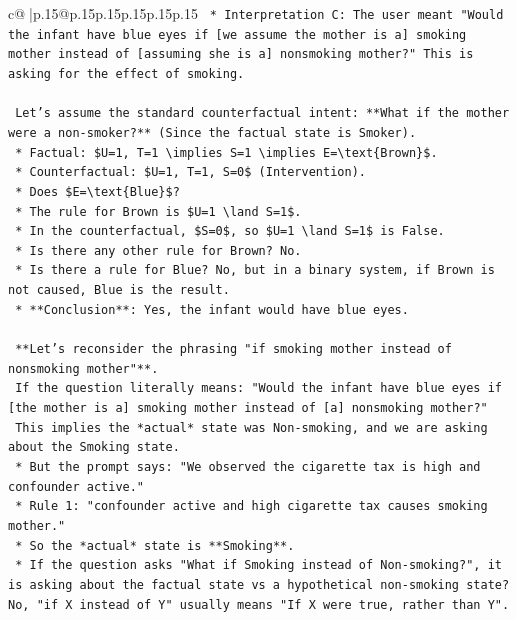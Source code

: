 \documentclass{article}
\begin{document}
{\begin{supertabular}{c@{$\;$}|p{.15\linewidth}@{}p{.15\linewidth}p{.15\linewidth}p{.15\linewidth}p{.15\linewidth}p{.15\linewidth}}
{{{\texttt{    *   Interpretation C: The user meant "Would the infant have blue eyes if {[}we assume the mother is a{]} smoking mother instead of {[}assuming she is a{]} nonsmoking mother?" This is asking for the effect of smoking.} \\
\\ 
\texttt{    Let's assume the standard counterfactual intent: **What if the mother were a non{-}smoker?** (Since the factual state is Smoker).} \\
\texttt{    *   Factual: \$U=1, T=1 \textbackslash{}implies S=1 \textbackslash{}implies E=\textbackslash{}text\{Brown\}\$.} \\
\texttt{    *   Counterfactual: \$U=1, T=1, S=0\$ (Intervention).} \\
\texttt{    *   Does \$E=\textbackslash{}text\{Blue\}\$?} \\
\texttt{    *   The rule for Brown is \$U=1 \textbackslash{}land S=1\$.} \\
\texttt{    *   In the counterfactual, \$S=0\$, so \$U=1 \textbackslash{}land S=1\$ is False.} \\
\texttt{    *   Is there any other rule for Brown? No.} \\
\texttt{    *   Is there a rule for Blue? No, but in a binary system, if Brown is not caused, Blue is the result.} \\
\texttt{    *   **Conclusion**: Yes, the infant would have blue eyes.} \\
\\ 
\texttt{    **Let's reconsider the phrasing "if smoking mother instead of nonsmoking mother"**.} \\
\texttt{    If the question literally means: "Would the infant have blue eyes if {[}the mother is a{]} smoking mother instead of {[}a{]} nonsmoking mother?"} \\
\texttt{    This implies the *actual* state was Non{-}smoking, and we are asking about the Smoking state.} \\
\texttt{    *   But the prompt says: "We observed the cigarette tax is high and confounder active."} \\
\texttt{    *   Rule 1: "confounder active and high cigarette tax causes smoking mother."} \\
\texttt{    *   So the *actual* state is **Smoking**.} \\
\texttt{    *   If the question asks "What if Smoking instead of Non{-}smoking?", it is asking about the factual state vs a hypothetical non{-}smoking state? No, "if X instead of Y" usually means "If X were true, rather than Y".} \\
}}}
\end{supertabular}}
\end{document}

